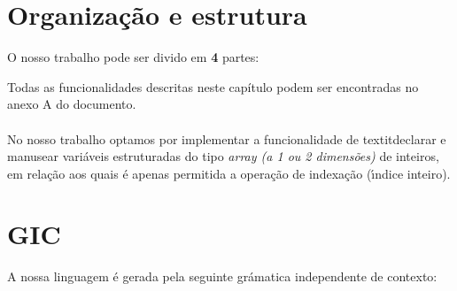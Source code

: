 \documentclass[11pt,a4paper]{report}%
\begin{document}
\section{Organização e estrutura}
O nosso trabalho pode ser divido em \textbf{4} partes:
Todas as funcionalidades descritas neste capítulo podem ser encontradas no anexo A do documento.\\ \\
No nosso trabalho optamos por implementar a funcionalidade de textit{declarar e manusear} variáveis estruturadas do tipo \textit{array (a 1 ou 2 dimensões)} de inteiros, em relação aos quais é apenas permitida a operação de indexação (ı́ndice inteiro).\\

\section{GIC}
A nossa linguagem é gerada pela seguinte grámatica independente de contexto:
\end{document}
